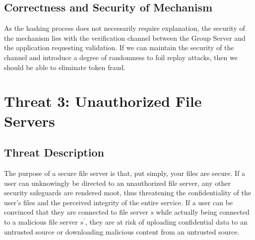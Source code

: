 \documentclass[11pt]{article}
\begin{document}
\subsection{Correctness and Security of Mechanism}
As the hashing process does not necessarily require explanation, the security of the mechanism lies with the verification channel between the Group Server and the application requesting validation. If we can maintain the security of the channel and introduce a degree of randomness to foil replay attacks, then we should be able to eliminate token fraud.
\section{Threat 3: Unauthorized File Servers}
\subsection{Threat Description}
The purpose of a secure file server is that, put simply, your files are secure. If a user can unknowingly be directed to an unauthorized file server, any other security safeguards are rendered moot, thus threatening the confidentiality of the user's files and the perceived integrity of the entire service. If a user can be convinced that they are connected to file server $s$ while actually being connected to a malicious file server $s^\prime$, they are at risk of uploading confidential data to an untrusted source or downloading malicious content from an untrusted source.
\end{document}
